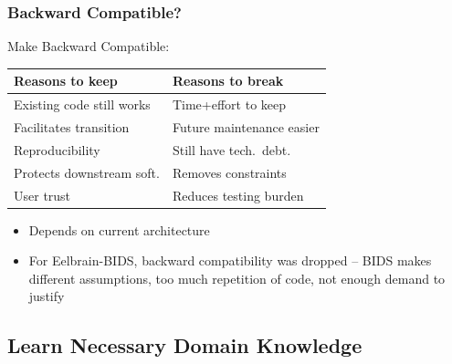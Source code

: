 \documentclass{beamer}
\begin{document}

\begin{frame}

\frametitle{Backward Compatible?}

Make Backward Compatible:

\begin{table}[ht]
\centering
\begin{tabular}{p{} p{}}
\toprule
\textbf{Reasons to keep} & \textbf{Reasons to break} \\
\midrule
Existing code still works & Time+effort to keep\\
Facilitates transition & Future maintenance easier\\ 
Reproducibility & Still have tech.\ debt.\\ 
Protects downstream soft. & Removes constraints\\
User trust & Reduces testing burden\\
\bottomrule
\end{tabular}
\end{table}

\begin{itemize}
\item Depends on current architecture
\item For Eelbrain-BIDS, backward compatibility was dropped -- BIDS makes
different assumptions, too much repetition of code, not enough demand to justify
\end{itemize}

\end{frame}


\subsection[Learn]{Learn Necessary Domain Knowledge}

\end{document}
